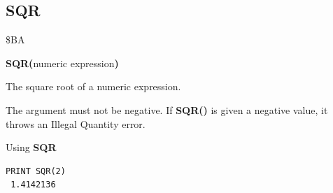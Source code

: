 
\newpage
\subsection{SQR}
\begin{description}[leftmargin=2cm,style=nextline]
\item [Token:]    \$BA

\item [Format:]   {\bf SQR(}numeric expression{\bf)}

\item [Returns:]  The square root of a numeric expression.

\item [Remarks:]  The argument must not be negative. If {\bf SQR()} is given a negative value, it throws an Illegal Quantity error.

\item [Example:]  Using {\bf SQR}

\begin{tcolorbox}[colback=black,coltext=white]
\verbatimfont{\codefont}
\begin{verbatim}
PRINT SQR(2)
 1.4142136
\end{verbatim}
\end{tcolorbox}
\end{description}


\newpage
